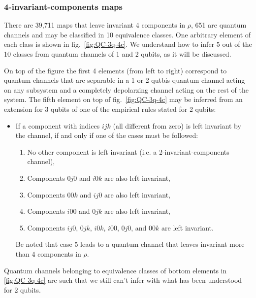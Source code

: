 \documentclass[11pt,dvipsnames]{article} %
\newcommand{\fref}[1]{fig.~\ref{#1}}  \newcommand{\tref}[1]{table~\ref{#1}}
\newcommand{\1}{\mathds{1}}
\begin{document}
\subsubsection*{4-invariant-components maps}
There are 39,711 maps that leave invariant 4 components in $\rho$, 651
are quantum channels and may be classified in 10 equivalence classes.
One arbitrary element of each class is shown in \fref{fig:QC-3q-4c}. 
We understand how to infer 5 out of the 10 classes from quantum channels
of 1 and 2 qubits, as it will be discussed.


On top of the figure the first 4 elements
(from left to right) correspond to quantum channels that are separable
in a 1 or 2 qutbis quantum channel acting on any subsystem 
and a completely depolarzing channel acting on the rest of the system.
The fifth element on top of \fref{fig:QC-3q-4c} may be inferred from
an extension for 3 qubits of one of the empirical rules stated for 2 qubits: 
\begin{itemize}
	\item If a component with indices $ijk$ (all different from zero) is
	left invariant by the channel, if and only if one of the cases must be followed:
	\begin{enumerate}
		\item No other component is left invariant (i.e. a 2-invariant-components
		channel),
		\item Components $0j0$ and $i0k$ are also left invariant,
		\item Components $00k$ and $ij0$ are also left invariant,
		\item Components $i00$ and $0jk$ are also left invariant,
		\item Components $ij0$, $0jk$, $i0k$, $i00$, $0j0$, and
		$00k$ are left invariant.
	\end{enumerate}
	Be noted that case 5 leads to a quantum channel that leaves invariant
	more than 4 components in $\rho$.
\end{itemize}
Quantum channels belonging to equivalence classes of bottom elements in 
\ref{fig:QC-3q-4c} are such that we still can't infer with what has 
been understood for 2 qubits.
\end{document}
